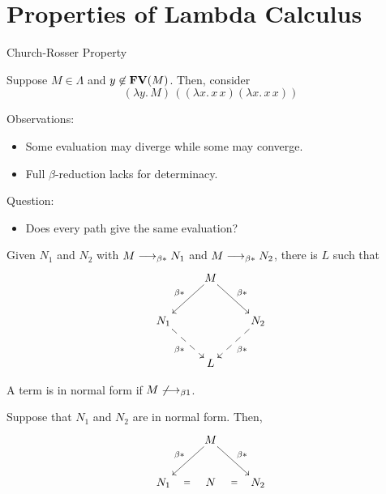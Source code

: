 \section{Properties of Lambda Calculus}
\begin{frame}[allowframebreaks]{Church-Rosser Property}
  \begin{example}
    Suppose $M \in \Lambda$ and $y \not\in \mathbf{FV}(M)$. 
    Then, consider 
    \[
      (\lambda y.\, M)\, ((\lambda x.\, x\,x)(\lambda x.\, x\, x))
    \]
  \end{example}
  Observations:
  \begin{itemize}
    \item Some evaluation may diverge while some may converge.
    \item Full $\beta$-reduction lacks for determinacy. 
  \end{itemize}
  Question:
  \begin{itemize}
    \item Does every path give the same evaluation?
  \end{itemize}

  \framebreak

\begin{theorem}
  Given $N_1$ and $N_2$ with $M \longrightarrow_{\beta*} N_1$ and $M\longrightarrow_{\beta*} N_2$, there is $L$
  such that
  \[
    \xymatrix{
      & M \ar[rd]^{\beta*} \ar[ld]_{\beta*} \\
      N_1 \ar@{-->}[rd]_{\beta*} & & N_2 \ar@{-->}[ld]^{\beta*} \\
      & L
    }
  \]
\end{theorem}
\framebreak
A term is in normal form if $M \not\longrightarrow_{\beta1}$. 

\begin{corollary}\label{coro:uniqueness-normal}
  Suppose that $N_1$ and $N_2$ are in normal form. Then, 
  \[
    \xymatrix{
      & M \ar[rd]^{\beta*} \ar[ld]_{\beta*} \\
      N_1 \ar@{}[r]|{=} & N & N_2 \ar@{}[l]|{=} \\
    }
  \]
\end{corollary}


\end{frame}
